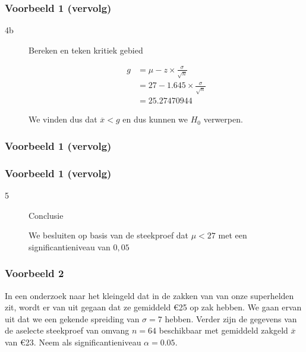 \documentclass[aspectratio=169]{beamer}
\begin{document}
\begin{frame}
  \frametitle{Voorbeeld 1 (vervolg)}
  
  \begin{description}
    
    \item[4b] Bereken en teken kritiek gebied
    
    \begin{align*}
    g &= \mu - z \times \frac{\sigma}{\sqrt{n}} \\
      &= 27 - 1.645 \times \frac{\sigma}{\sqrt{n}} \\
      &= 25.27470944
    \end{align*}
    
    We vinden dus dat $\overline{x} < g$ en dus kunnen we $H_{0}$ verwerpen.
  \end{description}
\end{frame}

\begin{frame}
  \frametitle{Voorbeeld 1 (vervolg)}
  
  \bigskip
  \centering
\end{frame}

\begin{frame}
  \frametitle{Voorbeeld 1 (vervolg)}
  
  \begin{description}
    
    \item[5] Conclusie
    
    We besluiten op basis van de steekproef dat $\mu < 27$ met een significantieniveau van $0,05$
  \end{description}
\end{frame}


\begin{frame}
  \frametitle{Voorbeeld 2}
  In een onderzoek naar het kleingeld dat in de zakken van  van  onze superhelden zit, wordt er van uit gegaan dat ze gemiddeld \euro{25} op zak hebben. We gaan ervan uit dat we een gekende spreiding van $\sigma = 7$ hebben. Verder zijn de gegevens van de aselecte steekproef van omvang $n=64$ beschikbaar met gemiddeld zakgeld $\overline{x}$ van \euro{23}. Neem als significantieniveau $\alpha = 0.05$.
\end{frame}
\end{document}
